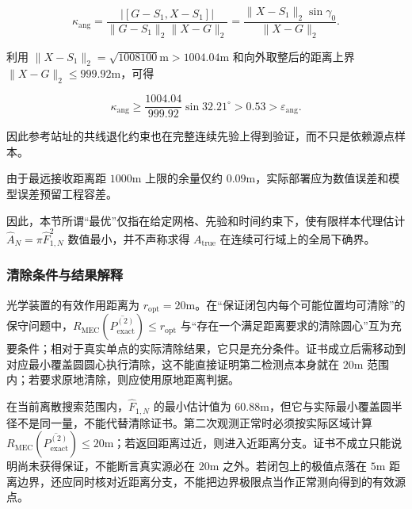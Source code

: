 \[
\kappa_{\mathrm{ang}}
=\frac{|[G-S_1,X-S_1]|}{\lVert G-S_1\rVert_2\lVert X-G\rVert_2}
=\frac{\lVert X-S_1\rVert_2\sin\gamma_0}{\lVert X-G\rVert_2}.
\]

利用 $\lVert X-S_1\rVert_2=\sqrt{1008100}\mathrm{m}>1004.04\mathrm{m}$ 和向外取整后的距离上界 $\lVert X-G\rVert_2\le999.92\mathrm{m}$，可得

\[
\kappa_{\mathrm{ang}}
\ge\frac{1004.04}{999.92}\sin32.21^\circ
>0.53>\varepsilon_{\mathrm{ang}}.
\]

因此参考站址的共线退化约束也在完整连续先验上得到验证，而不只是依赖源点样本。

由于最远接收距离距 $1000\mathrm{m}$ 上限的余量仅约 $0.09\mathrm{m}$，实际部署应为数值误差和模型误差预留工程容差。

因此，本节所谓“最优”仅指在给定网格、先验和时间约束下，使有限样本代理估计 $\widehat A_N=\pi\widehat F_{1,N}^2$ 数值最小，并不声称求得 $A_{\mathrm{true}}$ 在连续可行域上的全局下确界。

\subsubsection{清除条件与结果解释}

光学装置的有效作用距离为 $r_{\mathrm{opt}}=20\mathrm{m}$。在“保证闭包内每个可能位置均可清除”的保守问题中，$R_{\mathrm{MEC}}(\overline{P_{\mathrm{exact}}^{(2)}})\le r_{\mathrm{opt}}$ 与“存在一个满足距离要求的清除圆心”互为充要条件；相对于真实单点的实际清除结果，它只是充分条件。证书成立后需移动到对应最小覆盖圆圆心执行清除，这不能直接证明第二检测点本身就在 $20\mathrm{m}$ 范围内；若要求原地清除，则应使用原地距离判据。

在当前离散搜索范围内，$\widehat F_{1,N}$ 的最小估计值为 $60.88\mathrm{m}$，但它与实际最小覆盖圆半径不是同一量，不能代替清除证书。第二次观测正常时必须按实际区域计算 $R_{\mathrm{MEC}}(\overline{P_{\mathrm{exact}}^{(2)}})\le20\mathrm{m}$；若返回距离过近，则进入近距离分支。证书不成立只能说明尚未获得保证，不能断言真实源必在 $20\mathrm{m}$ 之外。若闭包上的极值点落在 $5\mathrm{m}$ 距离边界，还应同时核对近距离分支，不能把边界极限点当作正常测向得到的有效源点。

